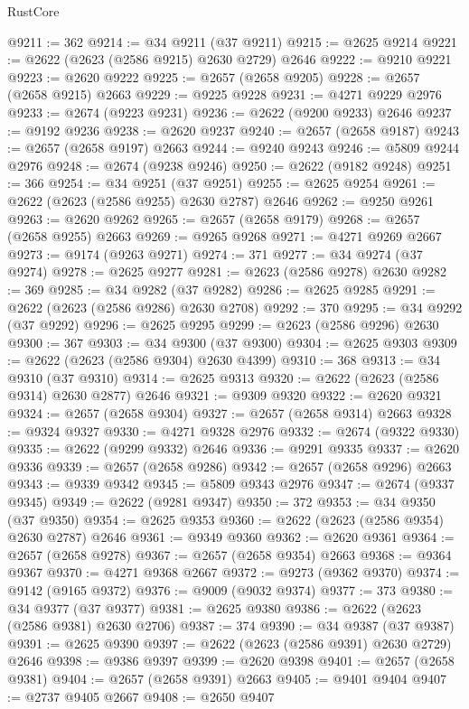 \begin{lexlean}{RustCore}
\begin{coremodule}
@9211 := 362
@9214 := @34 @9211 (@37 @9211)
@9215 := @2625 @9214
@9221 := @2622 (@2623 (@2586 @9215) @2630 @2729) @2646
@9222 := @9210 @9221
@9223 := @2620 @9222
@9225 := @2657 (@2658 @9205)
@9228 := @2657 (@2658 @9215) @2663
@9229 := @9225 @9228
@9231 := @4271 @9229 @2976
@9233 := @2674 (@9223 @9231)
@9236 := @2622 (@9200 @9233) @2646
@9237 := @9192 @9236
@9238 := @2620 @9237
@9240 := @2657 (@2658 @9187)
@9243 := @2657 (@2658 @9197) @2663
@9244 := @9240 @9243
@9246 := @5809 @9244 @2976
@9248 := @2674 (@9238 @9246)
@9250 := @2622 (@9182 @9248)
@9251 := 366
@9254 := @34 @9251 (@37 @9251)
@9255 := @2625 @9254
@9261 := @2622 (@2623 (@2586 @9255) @2630 @2787) @2646
@9262 := @9250 @9261
@9263 := @2620 @9262
@9265 := @2657 (@2658 @9179)
@9268 := @2657 (@2658 @9255) @2663
@9269 := @9265 @9268
@9271 := @4271 @9269 @2667
@9273 := @9174 (@9263 @9271)
@9274 := 371
@9277 := @34 @9274 (@37 @9274)
@9278 := @2625 @9277
@9281 := @2623 (@2586 @9278) @2630
@9282 := 369
@9285 := @34 @9282 (@37 @9282)
@9286 := @2625 @9285
@9291 := @2622 (@2623 (@2586 @9286) @2630 @2708)
@9292 := 370
@9295 := @34 @9292 (@37 @9292)
@9296 := @2625 @9295
@9299 := @2623 (@2586 @9296) @2630
@9300 := 367
@9303 := @34 @9300 (@37 @9300)
@9304 := @2625 @9303
@9309 := @2622 (@2623 (@2586 @9304) @2630 @4399)
@9310 := 368
@9313 := @34 @9310 (@37 @9310)
@9314 := @2625 @9313
@9320 := @2622 (@2623 (@2586 @9314) @2630 @2877) @2646
@9321 := @9309 @9320
@9322 := @2620 @9321
@9324 := @2657 (@2658 @9304)
@9327 := @2657 (@2658 @9314) @2663
@9328 := @9324 @9327
@9330 := @4271 @9328 @2976
@9332 := @2674 (@9322 @9330)
@9335 := @2622 (@9299 @9332) @2646
@9336 := @9291 @9335
@9337 := @2620 @9336
@9339 := @2657 (@2658 @9286)
@9342 := @2657 (@2658 @9296) @2663
@9343 := @9339 @9342
@9345 := @5809 @9343 @2976
@9347 := @2674 (@9337 @9345)
@9349 := @2622 (@9281 @9347)
@9350 := 372
@9353 := @34 @9350 (@37 @9350)
@9354 := @2625 @9353
@9360 := @2622 (@2623 (@2586 @9354) @2630 @2787) @2646
@9361 := @9349 @9360
@9362 := @2620 @9361
@9364 := @2657 (@2658 @9278)
@9367 := @2657 (@2658 @9354) @2663
@9368 := @9364 @9367
@9370 := @4271 @9368 @2667
@9372 := @9273 (@9362 @9370)
@9374 := @9142 (@9165 @9372)
@9376 := @9009 (@9032 @9374)
@9377 := 373
@9380 := @34 @9377 (@37 @9377)
@9381 := @2625 @9380
@9386 := @2622 (@2623 (@2586 @9381) @2630 @2706)
@9387 := 374
@9390 := @34 @9387 (@37 @9387)
@9391 := @2625 @9390
@9397 := @2622 (@2623 (@2586 @9391) @2630 @2729) @2646
@9398 := @9386 @9397
@9399 := @2620 @9398
@9401 := @2657 (@2658 @9381)
@9404 := @2657 (@2658 @9391) @2663
@9405 := @9401 @9404
@9407 := @2737 @9405 @2667
@9408 := @2650 @9407

\end{coremodule}
\end{lexlean}
